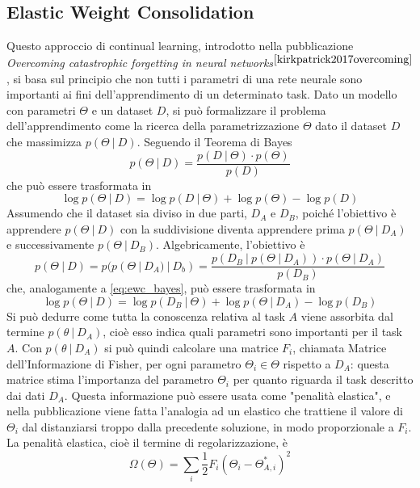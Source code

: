 \subsection{Elastic Weight Consolidation}
Questo approccio di continual learning, introdotto nella pubblicazione \textit{Overcoming catastrophic forgetting in neural networks}$^{\cite{kirkpatrick2017overcoming}}$, si basa sul principio che non tutti i parametri di una rete neurale sono importanti ai fini dell'apprendimento di un determinato task. Dato un modello con parametri $\Theta$ e un dataset $D$, si può formalizzare il problema dell'apprendimento come la ricerca della parametrizzazione $\Theta$ dato il dataset $D$ che massimizza $p(\Theta\:|\:D)$. Seguendo il Teorema di Bayes
\begin{equation}\label{eq:ewc_bayes}
    p(\Theta\:|\:D) = \frac{p(D\:|\:\Theta)\cdot p(\Theta)}{p(D)}
\end{equation}
che può essere trasformata in 
\begin{equation}\label{eq:ewc_bayes2}
    \log p(\Theta\:|\:D) = \log p(D\:|\:\Theta) + \log p(\Theta) - \log p(D)
\end{equation}
Assumendo che il dataset sia diviso in due parti, $D_A$ e $D_B$, poiché l'obiettivo è apprendere $p(\Theta\:|\:D)$ con la suddivisione diventa apprendere prima $p(\Theta\:|\:D_A)$ e successivamente $p(\Theta\:|\:D_B)$. Algebricamente, l'obiettivo è
\begin{equation}\label{eq:ewc2}
    p(\Theta\:|\:D) = p(p(\Theta\:|\:D_A)\:|\:D_b) = \frac{p(D_B\:|\:p(\Theta\:|\:D_A))\cdot p(\Theta\:|\:D_A)}{p(D_B)}
\end{equation}
che, analogamente a \ref{eq:ewc_bayes}, può essere trasformata in
\begin{equation}\label{eq:ewc3}
    \log p(\Theta\:|\:D) = \log p(D_B\:|\:\Theta) + \log p(\Theta\:|\:D_A) - \log p(D_B)
\end{equation}
Si può dedurre come tutta la conoscenza relativa al task $A$ viene assorbita dal termine $p(\theta\:|\: D_A)$, cioè esso indica quali parametri sono importanti per il task $A$. Con $p(\theta\:|\: D_A)$ si può quindi calcolare una matrice $F_i$, chiamata Matrice dell'Informazione di Fisher, per ogni parametro $\Theta_i \in \Theta$ rispetto a $D_A$: questa matrice stima l'importanza del parametro $\Theta_i$ per quanto riguarda il task descritto dai dati $D_A$. Questa informazione può essere usata come "penalità elastica", e nella pubblicazione viene fatta l'analogia ad un elastico che trattiene il valore di $\Theta_i$ dal distanziarsi troppo dalla precedente soluzione, in modo proporzionale a $F_i$. La penalità elastica, cioè il termine di regolarizzazione, è\begin{equation}\label{eq:ewc_penalty}
    \Omega(\Theta) = \sum_i \frac{1}{2} F_i\left(\Theta_i - \Theta_{A,i}^*\right)^2
\end{equation}
